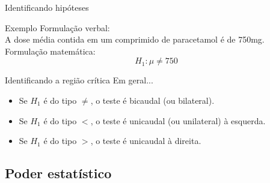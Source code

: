 \documentclass{beamer}
\begin{document}
\begin{frame}{\scriptsize Identificando hipóteses}
  \begin{exampleblock}{Exemplo}
    \footnotesize
    Formulação verbal:\\
    A dose média contida em um comprimido de paracetamol é de 750mg.\\
    \bigskip
    Formulação matemática:\\
    \begin{displaymath}
      H_1: \mu \ne 750
    \end{displaymath}
  \end{exampleblock}
  \begin{center}
  \end{center}
\end{frame}

\begin{frame}{\scriptsize Identificando a região crítica}
  Em geral...
  \begin{itemize}
    \footnotesize
  \item Se $H_1$ é do tipo $\ne$, o teste é bicaudal (ou bilateral).
  \item Se $H_1$ é do tipo $<$, o teste é unicaudal (ou unilateral) à esquerda.
  \item Se $H_1$ é do tipo $>$, o teste é unicaudal à direita.
  \end{itemize}
\end{frame}

\subsection{Poder estatístico}
\end{document}
